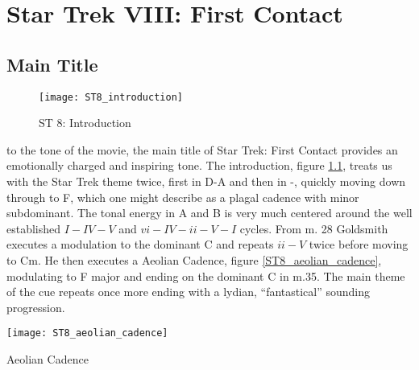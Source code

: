 
\chapter{Star Trek VIII: First Contact}\label{ch:st 8}

\section{Main Title}
\begin{figure}[h!]
\center
\texttt{[image: ST8\_introduction]}
	\caption{ST 8: Introduction}
	\label{ST8_introduction}
\end{figure}

\noindent{} to the tone of the movie, the main title of Star Trek: First Contact provides an emotionally charged and inspiring tone. The introduction, figure \ref{ST8_introduction}, treats us with the Star Trek theme twice, first in D-A and then in \fiss-\ciss, quickly moving down through \bflatm to F, which one might describe as a plagal cadence with minor subdominant. The tonal energy in A and B is very much centered around the well established \(I-IV-V\) and \(vi-IV-ii-V-I\) cycles. 
From m. 28 Goldsmith executes a modulation to the dominant C and repeats \(ii-V\) twice before moving to Cm. He then executes a Aeolian Cadence, figure \ref{ST8_aeolian_cadence}, modulating to F major and ending on the dominant C in m.35. The main theme of the cue repeats once more ending with a lydian, ``fantastical'' sounding progression. 
\begin{marginfigure}
\texttt{[image: ST8\_aeolian\_cadence]}
	\caption{Aeolian Cadence}
	\label{ST8_aeolian_cadence}
\end{marginfigure}

\clearpage


